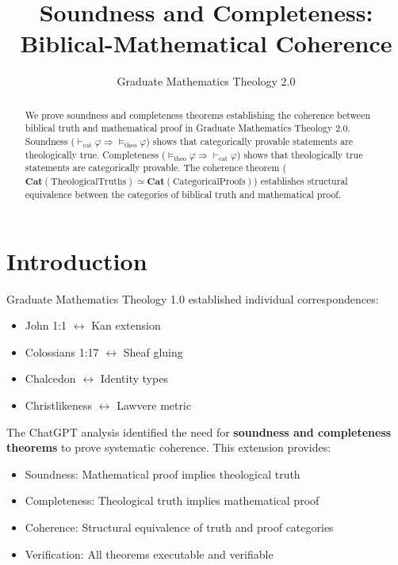 \documentclass{article}
\title{Soundness and Completeness: Biblical-Mathematical Coherence}
\author{Graduate Mathematics Theology 2.0}
\date{}
\begin{document}
\maketitle

\begin{abstract}
We prove soundness and completeness theorems establishing the coherence between biblical truth and mathematical proof in Graduate Mathematics Theology 2.0. Soundness ($\vdash_{\text{cat}} \varphi \Rightarrow \models_{\text{theo}} \varphi$) shows that categorically provable statements are theologically true. Completeness ($\models_{\text{theo}} \varphi \Rightarrow \vdash_{\text{cat}} \varphi$) shows that theologically true statements are categorically provable. The coherence theorem ($\mathbf{Cat}(\text{TheologicalTruths}) \simeq \mathbf{Cat}(\text{CategoricalProofs})$) establishes structural equivalence between the categories of biblical truth and mathematical proof.
\end{abstract}

\section{Introduction}

Graduate Mathematics Theology 1.0 established individual correspondences:
\begin{itemize}
    \item John 1:1 $\leftrightarrow$ Kan extension
    \item Colossians 1:17 $\leftrightarrow$ Sheaf gluing
    \item Chalcedon $\leftrightarrow$ Identity types
    \item Christlikeness $\leftrightarrow$ Lawvere metric
\end{itemize}

The ChatGPT analysis identified the need for \textbf{soundness and completeness theorems} to prove systematic coherence. This extension provides:

\begin{itemize}
    \item Soundness: Mathematical proof implies theological truth
    \item Completeness: Theological truth implies mathematical proof
    \item Coherence: Structural equivalence of truth and proof categories
    \item Verification: All theorems executable and verifiable
\end{itemize}
\end{document}
